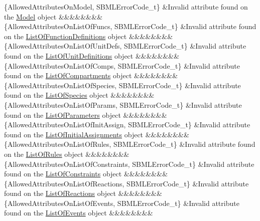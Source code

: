 \begin{DoxyParagraph}{}
\begin{longtabu}
\{Allowed\+Attributes\+On\+Model, S\+B\+M\+L\+Error\+Code\+\_\+t\} &Invalid attribute found on the \hyperlink{class_model}{Model} object &&&&&&&&\\
\{Allowed\+Attributes\+On\+List\+Of\+Funcs, S\+B\+M\+L\+Error\+Code\+\_\+t\} &Invalid attribute found on the \hyperlink{class_list_of_function_definitions}{List\+Of\+Function\+Definitions} object &&&&&&&&\\
\{Allowed\+Attributes\+On\+List\+Of\+Unit\+Defs, S\+B\+M\+L\+Error\+Code\+\_\+t\} &Invalid attribute found on the \hyperlink{class_list_of_unit_definitions}{List\+Of\+Unit\+Definitions} object &&&&&&&&\\
\{Allowed\+Attributes\+On\+List\+Of\+Comps, S\+B\+M\+L\+Error\+Code\+\_\+t\} &Invalid attribute found on the \hyperlink{class_list_of_compartments}{List\+Of\+Compartments} object &&&&&&&&\\
\{Allowed\+Attributes\+On\+List\+Of\+Species, S\+B\+M\+L\+Error\+Code\+\_\+t\} &Invalid attribute found on the \hyperlink{class_list_of_species}{List\+Of\+Species} object &&&&&&&&\\
\{Allowed\+Attributes\+On\+List\+Of\+Params, S\+B\+M\+L\+Error\+Code\+\_\+t\} &Invalid attribute found on the \hyperlink{class_list_of_parameters}{List\+Of\+Parameters} object &&&&&&&&\\
\{Allowed\+Attributes\+On\+List\+Of\+Init\+Assign, S\+B\+M\+L\+Error\+Code\+\_\+t\} &Invalid attribute found on the \hyperlink{class_list_of_initial_assignments}{List\+Of\+Initial\+Assignments} object &&&&&&&&\\
\{Allowed\+Attributes\+On\+List\+Of\+Rules, S\+B\+M\+L\+Error\+Code\+\_\+t\} &Invalid attribute found on the \hyperlink{class_list_of_rules}{List\+Of\+Rules} object &&&&&&&&\\
\{Allowed\+Attributes\+On\+List\+Of\+Constraints, S\+B\+M\+L\+Error\+Code\+\_\+t\} &Invalid attribute found on the \hyperlink{class_list_of_constraints}{List\+Of\+Constraints} object &&&&&&&&\\
\{Allowed\+Attributes\+On\+List\+Of\+Reactions, S\+B\+M\+L\+Error\+Code\+\_\+t\} &Invalid attribute found on the \hyperlink{class_list_of_reactions}{List\+Of\+Reactions} object &&&&&&&&\\
\{Allowed\+Attributes\+On\+List\+Of\+Events, S\+B\+M\+L\+Error\+Code\+\_\+t\} &Invalid attribute found on the \hyperlink{class_list_of_events}{List\+Of\+Events} object &&&&&&&&\\

\end{longtabu}
\end{DoxyParagraph}
